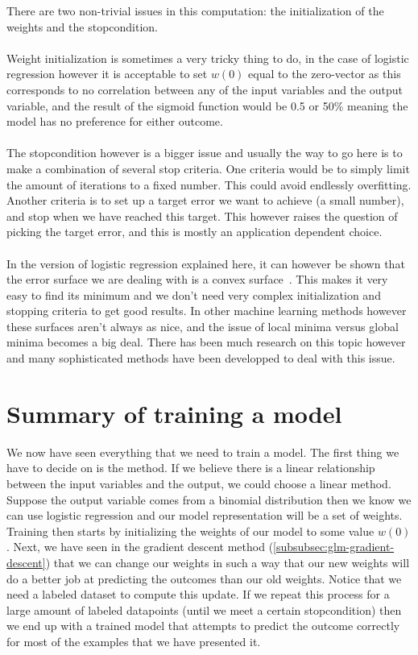 There are two non-trivial issues in this computation: the initialization of the weights and the stopcondition. \\ \\
Weight initialization is sometimes a very tricky thing to do, in the case of logistic regression however it is acceptable to set $w(0)$ equal to the zero-vector as this corresponds to no correlation between any of the input variables and the output variable, and the result of the sigmoid function would be 0.5 or 50\% meaning the model has no preference for either outcome.\\ \\
The stopcondition however is a bigger issue and usually the way to go here is to make a combination of several stop criteria. One criteria would be to simply limit the amount of iterations to a fixed number. This could avoid endlessly overfitting. Another criteria is to set up a target error we want to achieve (a small number), and stop when we have reached this target. This however raises the question of picking the target error, and this is mostly an application dependent choice. \\ \\
In the version of logistic regression explained here, it can however be shown that the error surface we are dealing with is a convex surface~\cite{convexerrorlogistic}. This makes it very easy to find its minimum and we don't need very complex initialization and stopping criteria to get good results. In other machine learning methods however these surfaces aren't always as nice, and the issue of local minima versus global minima becomes a big deal. There has been much research on this topic however and many sophisticated methods have been developped to deal with this issue.
\section{Summary of training a model}
We now have seen everything that we need to train a model. The first thing we have to decide on is the method. If we believe there is a linear relationship between the input variables and the output, we could choose a linear method. Suppose the output variable comes from a binomial distribution then we know we can use logistic regression and our model representation will be a set of weights. Training then starts by initializing the weights of our model to some value $w(0)$. Next, we have seen in the gradient descent method (\ref{subsubsec:glm-gradient-descent}) that we can change our weights in such a way that our new weights will do a better job at predicting the outcomes than our old weights. Notice that we need a labeled dataset to compute this update. If we repeat this process for a large amount of labeled datapoints (until we meet a certain stopcondition) then we end up with a trained model that attempts to predict the outcome correctly for most of the examples that we have presented it.
